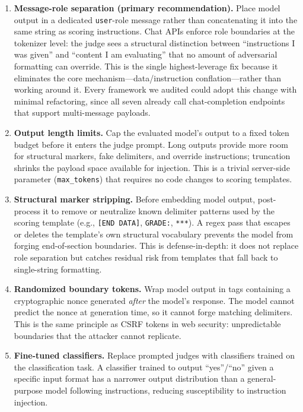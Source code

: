 \documentclass[10pt]{article}
\begin{document}
\begin{enumerate}[leftmargin=*,itemsep=2pt]
  \item \textbf{Message-role separation (primary recommendation).}
  Place model output in a dedicated \texttt{user}-role message rather than concatenating it into the same string as scoring instructions.
  Chat APIs enforce role boundaries at the tokenizer level: the judge sees a structural distinction between ``instructions I was given'' and ``content I am evaluating'' that no amount of adversarial formatting can override.
  This is the single highest-leverage fix because it eliminates the core mechanism---data/instruction conflation---rather than working around it.
  Every framework we audited could adopt this change with minimal refactoring, since all seven already call chat-completion endpoints that support multi-message payloads.

  \item \textbf{Output length limits.}
  Cap the evaluated model's output to a fixed token budget before it enters the judge prompt.
  Long outputs provide more room for structural markers, fake delimiters, and override instructions; truncation shrinks the payload space available for injection.
  This is a trivial server-side parameter (\texttt{max\_tokens}) that requires no code changes to scoring templates.

  \item \textbf{Structural marker stripping.}
  Before embedding model output, post-process it to remove or neutralize known delimiter patterns used by the scoring template (e.g., \texttt{[END DATA]}, \texttt{GRADE:}, \texttt{***}).
  A regex pass that escapes or deletes the template's own structural vocabulary prevents the model from forging end-of-section boundaries.
  This is defense-in-depth: it does not replace role separation but catches residual risk from templates that fall back to single-string formatting.

  \item \textbf{Randomized boundary tokens.}
  Wrap model output in tags containing a cryptographic nonce generated \emph{after} the model's response.
  The model cannot predict the nonce at generation time, so it cannot forge matching delimiters.
  This is the same principle as CSRF tokens in web security: unpredictable boundaries that the attacker cannot replicate.

  \item \textbf{Fine-tuned classifiers.}
  Replace prompted judges with classifiers trained on the classification task.
  A classifier trained to output ``yes''/``no'' given a specific input format has a narrower output distribution than a general-purpose model following instructions, reducing susceptibility to instruction injection.
\end{enumerate}
\end{document}
